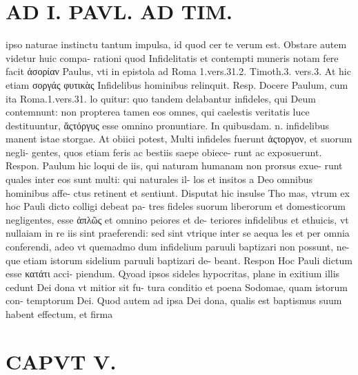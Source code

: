 \documentclass{article}
\begin{document}
\begin{pages}
\section*{AD I. PAVL. AD TIM. }
\marginpar{[ p.268 ]}\pstart ipso naturae instinctu tantum impulsa, id quod cer te verum est. Obstare autem videtur huic compa- rationi quod Infidelitatis et contempti muneris notam fere facit ἀσορίαν Paulus, vti in epistola ad Roma 1.vers.31.2. Timoth.3. vers.3. At hic etiam σοργάς φυτικὰς Infidelibus hominibus relinquit. Resp. Docere Paulum, cum ita Roma.1.vers.31. lo quitur: quo tandem delabantur infideles, qui Deum contemnunt: non propterea tamen eos omnes, qui caelestis veritatis luce destituuntur, ἄςτόργυς esse omnino pronuntiare. In quibusdam. n. infidelibus manent istae storgae. At obiici potest, Multi infideles fuerunt ἀςτοργον, et suorum negli- gentes, quos etiam feris ac bestiis saepe obiece- runt ac exposuerunt. Respon. Paulum hic loqui de iis, qui naturam humanam non prorsus exue- runt quales inter eos sunt multi: qui naturales il- los et insitos a Deo omnibus hominibus affe- ctus retinent et sentiunt. Disputat hic insulse Tho mas, vtrum ex hoc Pauli dicto colligi debeat pa- tres fideles suorum liberorum et domesticorum negligentes, esse ἀπλῶς et omnino peiores et de- teriores infidelibus et ethuicis, vt nullaiam in re iis sint praeferendi: sed sint vtrique inter se aequa les et per omnia conferendi, adeo vt quemadmo dum infidelium paruuli baptizari non possunt, ne- que etiam istorum sidelium paruuli baptizari de- beant. Respon Hoc Pauli dictum esse κατάτι acci- piendum. Qyoad ipsos sideles hypocritas, plane in exitium illis cedunt Dei dona vt mitior sit fu- tura conditio et poena Sodomae, quam istorum con- temptorum Dei. Quod autem ad ipsa Dei dona, qualis est baptismus suum habent effectum, et firma  \pend
\section*{CAPVT  V. }
\marginpar{[ p.269 ]}\pstart {}
{}

\end{pages}
\end{document}
